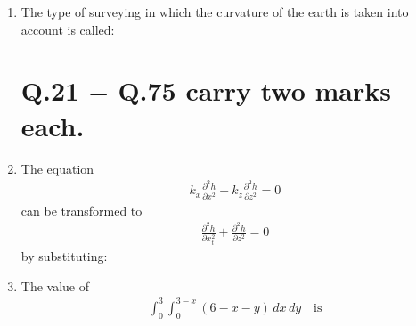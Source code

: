 \documentclass[journal]{IEEEtran}
\begin{document}
\begin{enumerate}
\item The type of surveying in which the curvature of the earth is taken into account is called: \hfill {}
\begin{enumerate}
\end{enumerate}

\section*{Q.21 $-$ Q.75 carry two marks each.}

\item The equation 
\begin{align}
k_x \frac{\partial^2 h}{\partial x^2} + k_z \frac{\partial^2 h}{\partial z^2} = 0
\end{align}
can be transformed to \begin{align}
\frac{\partial^2 h}{\partial x_t^2} + \frac{\partial^2 h}{\partial z^2} = 0
\end{align}
by substituting: \hfill {}
\begin{enumerate}
\end{enumerate}

\item The value of 
\begin{align}
\int_0^3 \int_0^{3-x} (6 - x - y) \, dx \, dy \quad \text{is}
\end{align}
\hfill {}
\begin{enumerate}
\end{enumerate}


\end{enumerate}
\end{document}
